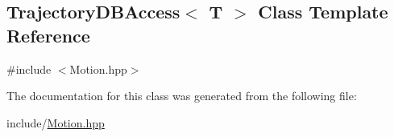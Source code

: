 \hypertarget{classTrajectoryDBAccess}{\subsection{Trajectory\-D\-B\-Access$<$ T $>$ Class Template Reference}
\label{classTrajectoryDBAccess}
}


{\ttfamily \#include $<$Motion.\-hpp$>$}



The documentation for this class was generated from the following file\-:\begin{DoxyCompactItemize}
\item 
include/\hyperlink{Motion_8hpp}{Motion.\-hpp}\end{DoxyCompactItemize}
